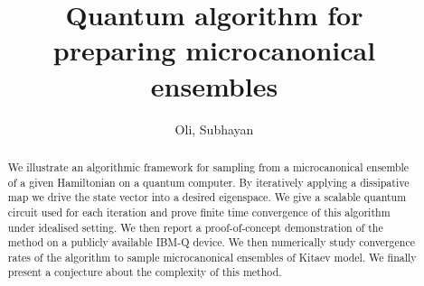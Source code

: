 \documentclass[10pt]{amsart}
\title[Quantum algorithm for preparing microcanonical ensembles]{Quantum algorithm for \\ preparing microcanonical ensembles}
\author{Oli, Subhayan}
\begin{document}
\maketitle

\begin{abstract}
    We illustrate an algorithmic framework for sampling from a microcanonical ensemble of a given Hamiltonian on a quantum computer. By iteratively applying a dissipative map we drive the state vector into a desired eigenspace. %
    We give a scalable quantum circuit used for each iteration and prove  finite time convergence of this algorithm under idealised setting. 
    We then report a proof-of-concept demonstration of the method on a publicly available IBM-Q device.
    We then numerically study convergence rates of the algorithm to sample microcanonical ensembles of Kitaev model. We finally present a conjecture about the complexity of this method.   
\end{abstract}







\end{document}

